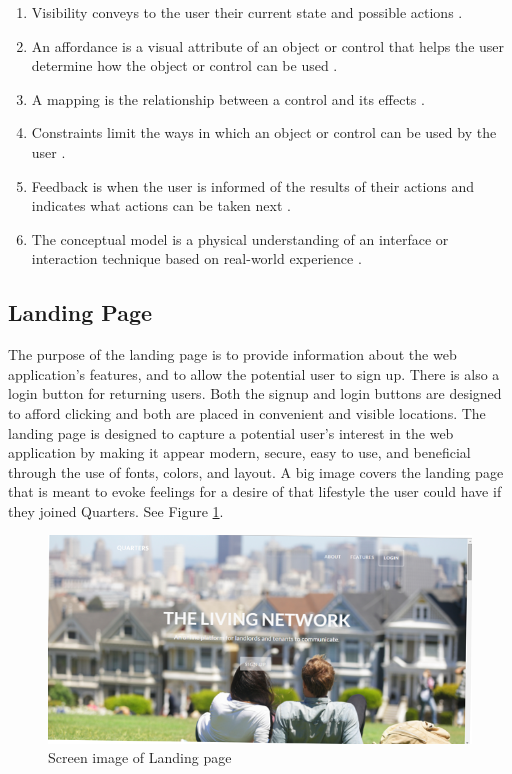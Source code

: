 \documentclass[12pt]{article}
\begin{document}
\begin{enumerate}
\item Visibility conveys to the user their current state and possible actions \cite{norman}.
\item An affordance is a visual attribute of an object or control that helps the user determine how the object or control can be used \cite{norman}.
\item A mapping is the relationship between a control and its effects \cite{norman}.
\item Constraints limit the ways in which an object or control can be used by the user \cite{norman}.
\item Feedback is when the user is informed of the results of their actions and indicates what actions can be taken next \cite{norman}.
\item The conceptual model is a physical understanding of an interface or interaction technique based on real-world experience \cite{norman}.
\end{enumerate}

\subsection{Landing Page}
The purpose of the landing page is to provide information about the web application's features, and to allow the potential user to sign up. There is also a login button for returning users. Both the signup and login buttons are designed to afford clicking and both are placed in convenient and visible locations. The landing page is designed to capture a potential user's interest in the web application by making it appear modern, secure, easy to use, and beneficial through the use of fonts, colors, and layout. A big image covers the landing page that is meant to evoke feelings for a desire of that lifestyle the user could have if they joined Quarters. See Figure \ref{fig:landingPage}.

\begin{figure}
\centering
\includegraphics[width=\textwidth]{landing}
\caption{Screen image of Landing page}
\label{fig:landingPage}
\end{figure}
\end{document}
